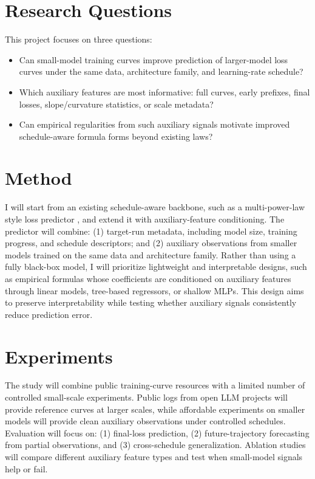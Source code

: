 \documentclass[10pt]{article}
\begin{document}
\section{Research Questions}
This project focuses on three questions:
\begin{itemize}
    \item Can small-model training curves improve prediction of larger-model loss curves under the same data, architecture family, and learning-rate schedule?
    \item Which auxiliary features are most informative: full curves, early prefixes, final losses, slope/curvature statistics, or scale metadata?
    \item Can empirical regularities from such auxiliary signals motivate improved schedule-aware formula forms beyond existing laws?
\end{itemize}

\section{Method}
I will start from an existing schedule-aware backbone, such as a multi-power-law style loss predictor \cite{luo2025multipower}, and extend it with auxiliary-feature conditioning. The predictor will combine: (1) target-run metadata, including model size, training progress, and schedule descriptors; and (2) auxiliary observations from smaller models trained on the same data and architecture family. Rather than using a fully black-box model, I will prioritize lightweight and interpretable designs, such as empirical formulas whose coefficients are conditioned on auxiliary features through linear models, tree-based regressors, or shallow MLPs. This design aims to preserve interpretability while testing whether auxiliary signals consistently reduce prediction error.

\section{Experiments}
The study will combine public training-curve resources with a limited number of controlled small-scale experiments. Public logs from open LLM projects will provide reference curves at larger scales, while affordable experiments on smaller models will provide clean auxiliary observations under controlled schedules. Evaluation will focus on: (1) final-loss prediction, (2) future-trajectory forecasting from partial observations, and (3) cross-schedule generalization. Ablation studies will compare different auxiliary feature types and test when small-model signals help or fail.
\end{document}
